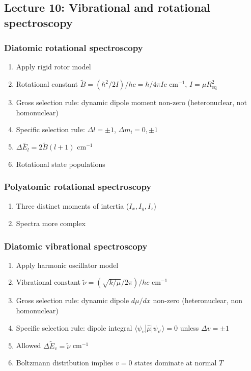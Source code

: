 \documentclass[11pt]{article}
\begin{document}
\subsection{Lecture 10: Vibrational and rotational spectroscopy}
\label{sec:org0e76a3b}
\subsubsection{Diatomic rotational spectroscopy}
\label{sec:org9c0d2b2}
\begin{enumerate}
\item Apply rigid rotor model
\item Rotational constant \(\tilde{B} = (\hbar^2/2I)/hc = \hbar/4\pi I c\) cm\(^{-1}\), \(I=\mu R_\mathrm{eq}^2\)
\item Gross selection rule: dynamic dipole moment non-zero (heteronuclear, not homonuclear)
\item Specific selection rule: \(\Delta l=\pm 1\), \(\Delta m_l=0, \pm1\)
\item \(\Delta \tilde{E_l}  = 2\tilde{B}(l+1)\) cm\(^{-1}\)
\item Rotational state populations
\end{enumerate}
\subsubsection{Polyatomic rotational spectroscopy}
\label{sec:orgecccf2e}
\begin{enumerate}
\item Three distinct moments of intertia (\(I_x, I_y, I_z\))
\item Spectra more complex
\end{enumerate}
\subsubsection{Diatomic vibrational spectroscopy}
\label{sec:org4e5f1fa}
\begin{enumerate}
\item Apply harmonic oscillator model
\item Vibrational constant \(\tilde{\nu} = (\sqrt{k/\mu}/2\pi)/hc\) cm\(^{-1}\)
\item Gross selection rule: dynamic dipole \(d\mu/dx\) non-zero (heteronuclear, non homonuclear)
\item Specific selection rule: dipole integral \(\langle \psi_v|\hat\mu|\psi_{v^\prime} \rangle =0\)
unless \(\Delta v = \pm 1\)
\item Allowed \(\Delta \tilde{E}_v = \tilde{\nu}\) cm\(^{-1}\)
\item Boltzmann distribution implies \(v=0\) states dominate at normal \(T\)
\end{enumerate}
\end{document}

